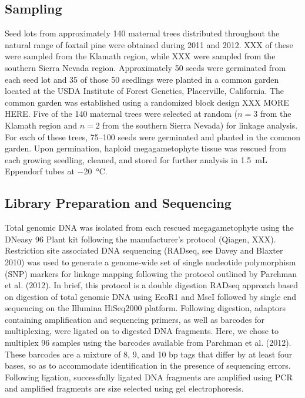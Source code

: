 \documentclass[11pt]{article}
\begin{document}
\subsection{Sampling}
Seed lots from approximately 140 maternal trees distributed throughout the natural range of foxtail pine were obtained during 2011 and 2012. XXX of these were sampled from the Klamath region, while XXX were sampled from the southern Sierra Nevada region. Approximately 50 seeds were germinated from each seed lot and 35 of those 50 seedlings were planted in a common garden located at the USDA Institute of Forest Genetics, Placerville, California. The common garden was established using a randomized block design XXX MORE HERE. Five of the 140 maternal trees were selected at random ($n = 3$ from the Klamath region and $n = 2$ from the southern Sierra Nevada) for linkage analysis. For each of these trees, \SIrange{75}{100}{} seeds were germinated and planted in the common garden. Upon germination, haploid megagametophyte tissue was rescued from each growing seedling, cleaned, and stored for further analysis in \SI{1.5}{\mL} Eppendorf tubes at \SI{-20}{\celsius}.


\subsection{Library Preparation and Sequencing}

Total genomic DNA was isolated from each rescued megagametophyte using the DNeasy 96 Plant kit following the manufacturer’s protocol (Qiagen, XXX). Restriction site associated DNA sequencing (RADseq, see Davey and Blaxter 2010) was used to generate a genome-wide set of single nucleotide polymorphism (SNP) markers for linkage mapping following the protocol outlined by Parchman et al. (2012). In brief, this protocol is a double digestion RADseq approach based on digestion of total genomic DNA using EcoR1 and MseI followed by single end sequencing on the Illumina HiSeq2000 platform. Following digestion, adaptors containing amplification and sequencing primers, as well as barcodes for multiplexing, were ligated on to digested DNA fragments. Here, we chose to multiplex 96 samples using the barcodes available from Parchman et al. (2012). These barcodes are a mixture of 8, 9, and 10 bp tags that differ by at least four bases, so as to accommodate identification in the presence of sequencing errors. Following ligation, successfully ligated DNA fragments are amplified using PCR and amplified fragments are size selected using gel electrophoresis. 
\end{document}
